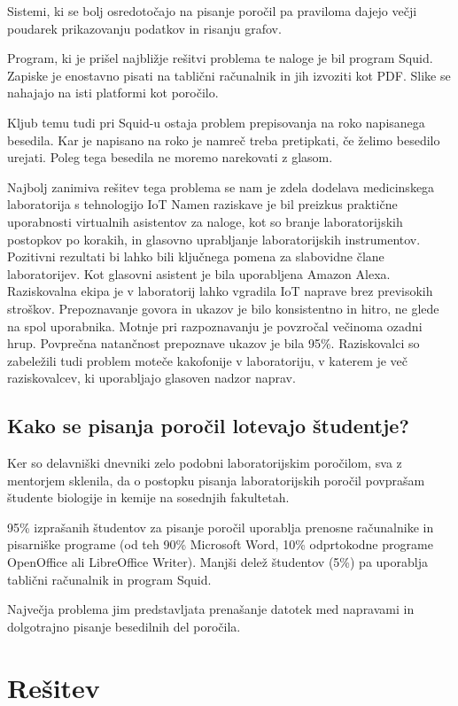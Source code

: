 \documentclass[a4paper, 12pt]{book}
\begin{document}
Sistemi, ki se bolj osredotočajo na pisanje poročil pa praviloma dajejo večji poudarek prikazovanju podatkov in risanju grafov.

Program, ki je prišel najbližje rešitvi problema te naloge je bil program Squid.
Zapiske je enostavno pisati na tablični računalnik in jih izvoziti kot PDF.
Slike se nahajajo na isti platformi kot poročilo.

Kljub temu tudi pri Squid-u ostaja problem prepisovanja na roko napisanega besedila.
Kar je napisano na roko je namreč treba pretipkati, če želimo besedilo urejati.
Poleg tega besedila ne moremo narekovati z glasom.

Najbolj zanimiva rešitev tega problema se nam je zdela dodelava medicinskega laboratorija s tehnologijo IoT %
Namen raziskave je bil preizkus praktične uporabnosti virtualnih asistentov za naloge, kot so branje laboratorijskih postopkov po korakih, in glasovno uprabljanje laboratorijskih instrumentov.
Pozitivni rezultati bi lahko bili ključnega pomena za slabovidne člane laboratorijev.
Kot glasovni asistent je bila uporabljena Amazon Alexa.
Raziskovalna ekipa je v laboratorij lahko vgradila IoT naprave brez previsokih stroškov.
Prepoznavanje govora in ukazov je bilo konsistentno in hitro, ne glede na spol uporabnika.
Motnje pri razpoznavanju je povzročal večinoma ozadni hrup.
Povprečna natančnost prepoznave ukazov je bila 95\%.
Raziskovalci so zabeležili tudi problem moteče kakofonije v laboratoriju, v katerem je več raziskovalcev, ki uporabljajo glasoven nadzor naprav.

\subsection{Kako se pisanja poročil lotevajo študentje?}
Ker so delavniški dnevniki zelo podobni laboratorijskim poročilom, sva z mentorjem sklenila, da o postopku pisanja laboratorijskih poročil povprašam študente biologije in kemije na sosednjih fakultetah.

95\% izprašanih študentov za pisanje poročil uporablja prenosne računalnike in pisarniške programe (od teh 90\% Microsoft Word, 10\% odprtokodne programe OpenOffice ali LibreOffice Writer).
Manjši delež študentov (5\%) pa uporablja tablični računalnik in program Squid.

Največja problema jim predstavljata prenašanje datotek med napravami in dolgotrajno pisanje besedilnih del poročila.

\section{Rešitev}
\end{document}
